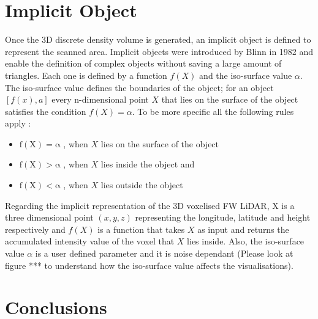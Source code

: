 \documentclass{subfiles}
\begin{document}
\section{Implicit Object}

\par Once the 3D discrete density volume is generated, an implicit object is defined to represent the scanned area. Implicit objects were introduced by Blinn in 1982 \cite{Blinn1982} and enable the definition of complex objects without saving a large amount of triangles. Each one is defined by a function $ \mathit{f(X)} $ and the iso-surface value $\alpha$. The iso-surface value defines the boundaries of the object; for an object $ [f(x),a]$ every n-dimensional point $ \mathit{X} $  that lies on the surface of the object satisfies the condition $ \mathit{f(X)=\alpha }  $. To be more specific all the following rules apply \cite{Pasko1994}: 
\begin{itemize}
	\item $	\mathrm{f(X) = \alpha }$ , when $X$ lies on the surface of the object
	\item $	\mathrm{f(X) > \alpha }$ , when $X$ lies inside the object and
	\item $	\mathrm{f(X) < \alpha }$ , when $X$ lies outside the object	 
\end{itemize}


\par Regarding the implicit representation of the 3D voxelised FW LiDAR, X is a three dimensional point $\mathit{(x, y, z) }$ representing the longitude, latitude and height respectively and ${f(X)}$ is a function that takes  $\mathit{X}$ as input and returns the accumulated intensity value of the voxel that  $\mathit{X}$ lies inside. Also, the iso-surface value $\mathit{\alpha }$ is a user defined parameter and it is noise dependant (Please look at figure *** to understand how the iso-surface value affects the visualisations). 


\section{Conclusions}
\end{document}
